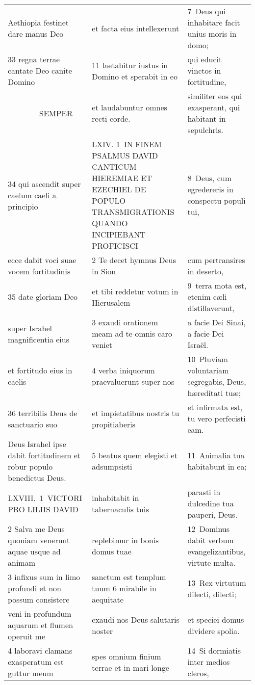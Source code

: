 \documentclass{article}
\begin{document}
\begin{longtable}{@{}p{}p{}p{}@{}}
Aethiopia festinet dare manus Deo	&	et facta eius intellexerunt	&	7 Deus qui inhabitare facit unius moris in domo;	\\
33 regna terrae cantate Deo canite Domino	&	11 laetabitur iustus in Domino et sperabit in eo	&	qui educit vinctos in fortitudine,	\\
    SEMPER	&	et laudabuntur omnes recti corde.	&	similiter eos qui exasperant, qui habitant in sepulchris.	\\
34 qui ascendit super caelum caeli a principio	&	LXIV. 1 IN FINEM PSALMUS DAVID CANTICUM HIEREMIAE ET EZECHIEL DE POPULO TRANSMIGRATIONIS QUANDO INCIPIEBANT PROFICISCI	&	8 Deus, cum egredereris in conspectu populi tui,	\\
ecce dabit voci suae vocem fortitudinis	&	2 Te decet hymnus Deus in Sion	&	cum pertransires in deserto,	\\
35 date gloriam Deo	&	et tibi reddetur votum in Hierusalem	&	9 terra mota est, etenim cæli distillaverunt,	\\
super Israhel magnificentia eius	&	3 exaudi orationem meam ad te omnis caro veniet	&	a facie Dei Sinai, a facie Dei Israël.	\\
et fortitudo eius in caelis	&	4 verba iniquorum praevaluerunt super nos	&	10 Pluviam voluntariam segregabis, Deus, hæreditati tuæ;	\\
36 terribilis Deus de sanctuario suo	&	et impietatibus nostris tu propitiaberis	&	et infirmata est, tu vero perfecisti eam.	\\
Deus Israhel ipse dabit fortitudinem et robur populo benedictus Deus.	&	5 beatus quem elegisti et adsumpsisti	&	11 Animalia tua habitabunt in ea;	\\
LXVIII. 1 VICTORI PRO LILIIS DAVID	&	inhabitabit in tabernaculis tuis	&	parasti in dulcedine tua pauperi, Deus.	\\
2 Salva me Deus quoniam venerunt aquae usque ad animam	&	replebimur in bonis domus tuae	&	12 Dominus dabit verbum evangelizantibus, virtute multa.	\\
3 infixus sum in limo profundi et non possum consistere	&	sanctum est templum tuum 6 mirabile in aequitate	&	13 Rex virtutum dilecti, dilecti;	\\
veni in profundum aquarum et flumen operuit me	&	exaudi nos Deus salutaris noster	&	et speciei domus dividere spolia.	\\
4 laboravi clamans exasperatum est guttur meum	&	spes omnium finium terrae et in mari longe	&	14 Si dormiatis inter medios cleros,	\\

\end{longtable}
\end{document}
